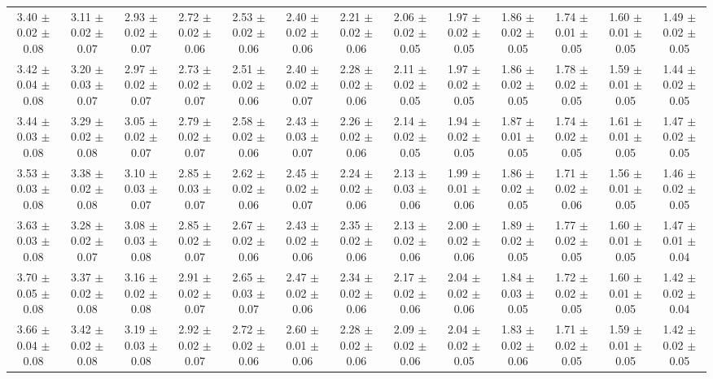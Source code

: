 \begin{landscape}
{\begin{tabular}{  | c | c | c | c | c | c | c | c | c | c | c | c | c | }
3.40 $\pm$0.02 $\pm$0.08 & 3.11 $\pm$0.02 $\pm$0.07 & 2.93 $\pm$0.02 $\pm$0.07 & 2.72 $\pm$0.02 $\pm$0.06 & 2.53 $\pm$0.02 $\pm$0.06 & 2.40 $\pm$0.02 $\pm$0.06 & 2.21 $\pm$0.02 $\pm$0.06 & 2.06 $\pm$0.02 $\pm$0.05 & 1.97 $\pm$0.02 $\pm$0.05 & 1.86 $\pm$0.02 $\pm$0.05 & 1.74 $\pm$0.01 $\pm$0.05 & 1.60 $\pm$0.01 $\pm$0.05 & 1.49 $\pm$0.02 $\pm$0.05\\
3.42 $\pm$0.04 $\pm$0.08 & 3.20 $\pm$0.03 $\pm$0.07 & 2.97 $\pm$0.02 $\pm$0.07 & 2.73 $\pm$0.02 $\pm$0.07 & 2.51 $\pm$0.02 $\pm$0.06 & 2.40 $\pm$0.02 $\pm$0.07 & 2.28 $\pm$0.02 $\pm$0.06 & 2.11 $\pm$0.02 $\pm$0.05 & 1.97 $\pm$0.02 $\pm$0.05 & 1.86 $\pm$0.02 $\pm$0.05 & 1.78 $\pm$0.02 $\pm$0.05 & 1.59 $\pm$0.01 $\pm$0.05 & 1.44 $\pm$0.02 $\pm$0.05\\
3.44 $\pm$0.03 $\pm$0.08 & 3.29 $\pm$0.02 $\pm$0.08 & 3.05 $\pm$0.02 $\pm$0.07 & 2.79 $\pm$0.02 $\pm$0.07 & 2.58 $\pm$0.02 $\pm$0.06 & 2.43 $\pm$0.03 $\pm$0.07 & 2.26 $\pm$0.02 $\pm$0.06 & 2.14 $\pm$0.02 $\pm$0.05 & 1.94 $\pm$0.02 $\pm$0.05 & 1.87 $\pm$0.01 $\pm$0.05 & 1.74 $\pm$0.02 $\pm$0.05 & 1.61 $\pm$0.01 $\pm$0.05 & 1.47 $\pm$0.02 $\pm$0.05\\
3.53 $\pm$0.03 $\pm$0.08 & 3.38 $\pm$0.02 $\pm$0.08 & 3.10 $\pm$0.03 $\pm$0.07 & 2.85 $\pm$0.03 $\pm$0.07 & 2.62 $\pm$0.02 $\pm$0.06 & 2.45 $\pm$0.02 $\pm$0.07 & 2.24 $\pm$0.02 $\pm$0.06 & 2.13 $\pm$0.03 $\pm$0.06 & 1.99 $\pm$0.01 $\pm$0.06 & 1.86 $\pm$0.02 $\pm$0.05 & 1.71 $\pm$0.02 $\pm$0.06 & 1.56 $\pm$0.01 $\pm$0.05 & 1.46 $\pm$0.02 $\pm$0.05\\
3.63 $\pm$0.03 $\pm$0.08 & 3.28 $\pm$0.02 $\pm$0.07 & 3.08 $\pm$0.03 $\pm$0.08 & 2.85 $\pm$0.02 $\pm$0.07 & 2.67 $\pm$0.02 $\pm$0.06 & 2.43 $\pm$0.02 $\pm$0.06 & 2.35 $\pm$0.02 $\pm$0.06 & 2.13 $\pm$0.02 $\pm$0.06 & 2.00 $\pm$0.02 $\pm$0.06 & 1.89 $\pm$0.02 $\pm$0.05 & 1.77 $\pm$0.02 $\pm$0.05 & 1.60 $\pm$0.01 $\pm$0.05 & 1.47 $\pm$0.01 $\pm$0.04\\
3.70 $\pm$0.05 $\pm$0.08 & 3.37 $\pm$0.02 $\pm$0.08 & 3.16 $\pm$0.02 $\pm$0.08 & 2.91 $\pm$0.02 $\pm$0.07 & 2.65 $\pm$0.03 $\pm$0.07 & 2.47 $\pm$0.02 $\pm$0.06 & 2.34 $\pm$0.02 $\pm$0.06 & 2.17 $\pm$0.02 $\pm$0.06 & 2.04 $\pm$0.02 $\pm$0.06 & 1.84 $\pm$0.03 $\pm$0.05 & 1.72 $\pm$0.02 $\pm$0.05 & 1.60 $\pm$0.01 $\pm$0.05 & 1.42 $\pm$0.02 $\pm$0.04\\
3.66 $\pm$0.04 $\pm$0.08 & 3.42 $\pm$0.02 $\pm$0.08 & 3.19 $\pm$0.03 $\pm$0.08 & 2.92 $\pm$0.02 $\pm$0.07 & 2.72 $\pm$0.02 $\pm$0.06 & 2.60 $\pm$0.01 $\pm$0.06 & 2.28 $\pm$0.02 $\pm$0.06 & 2.09 $\pm$0.02 $\pm$0.06 & 2.04 $\pm$0.02 $\pm$0.05 & 1.83 $\pm$0.02 $\pm$0.06 & 1.71 $\pm$0.02 $\pm$0.05 & 1.59 $\pm$0.01 $\pm$0.05 & 1.42 $\pm$0.02 $\pm$0.05\\

\end{tabular}}
\end{landscape}
